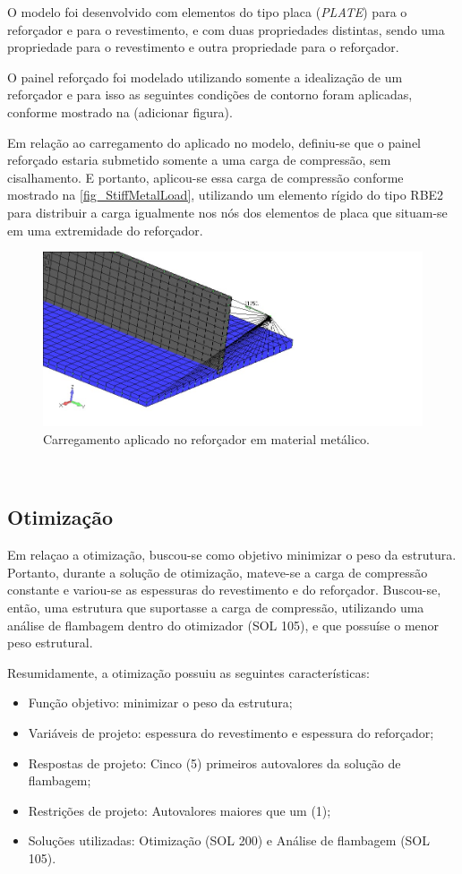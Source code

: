 {O modelo foi desenvolvido com elementos do tipo placa (\emph{PLATE}) para o reforçador e para o revestimento, e com duas propriedades distintas, sendo uma propriedade para o revestimento e outra propriedade para o reforçador.

O painel reforçado foi modelado utilizando somente a idealização de um reforçador e para isso as seguintes condições de contorno foram aplicadas, conforme mostrado na (adicionar figura). %

Em relação ao carregamento do aplicado no modelo, definiu-se que o painel reforçado estaria submetido somente a uma carga de compressão, sem cisalhamento. E portanto, aplicou-se essa carga de compressão conforme mostrado na \autoref{fig_StiffMetalLoad},
utilizando um elemento rígido do tipo RBE2 para distribuir a carga igualmente nos nós dos elementos de placa que situam-se em uma extremidade do reforçador.

\begin{figure}[h]
	\caption{\label{fig_StiffMetalLoad}Carregamento aplicado no reforçador em material metálico.}
  \centering
  \includegraphics[scale=0.7]{figura/StiffMetalLoad}
\end{figure}
\

\subsection{Otimização}
Em relaçao a otimização, buscou-se como objetivo minimizar o peso da estrutura. Portanto, durante a solução de otimização, mateve-se a carga de compressão constante e variou-se as espessuras do revestimento e do reforçador. Buscou-se, então, uma estrutura que suportasse a carga de compressão, utilizando uma análise de flambagem dentro do otimizador (SOL 105), e que possuíse o menor peso estrutural.

Resumidamente, a otimização possuiu as seguintes características:
\begin{itemize}
\item Função objetivo: minimizar o peso da estrutura;
\item Variáveis de projeto: espessura do revestimento e espessura do reforçador;
\item Respostas de projeto: Cinco (5) primeiros autovalores da solução de flambagem;
\item Restrições de projeto: Autovalores maiores que um (1);
\item Soluções utilizadas: Otimização (SOL 200) e Análise de flambagem (SOL 105).
\end{itemize}

}
